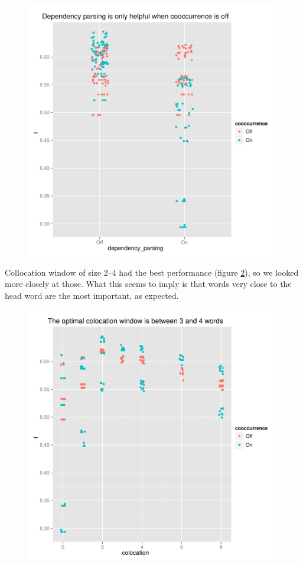 \documentclass{article}
\begin{document}
\begin{figure}[h]
\includegraphics[width=\textwidth]{pg_0001}
\caption{\label{fig1}}
\end{figure}

Collocation window of size 2--4 had the best performance (figure
\ref{fig2}), so we looked more closely at those. What this seems to
imply is that words very close to the head word are the most
important, as expected.

\begin{figure}[h]
\includegraphics[width=\textwidth]{pg_0002}
\caption{\label{fig2}}
\end{figure}
\end{document}
